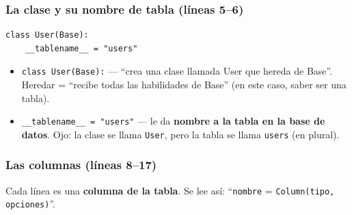 \documentclass[11pt,a4paper]{article}
\begin{document}
\subsubsection{La clase y su nombre de tabla (líneas 5--6)}

\begin{lstlisting}
class User(Base):
    __tablename__ = "users"
\end{lstlisting}

\begin{itemize}
    \item \texttt{class User(Base):} --- ``crea una clase llamada User que hereda de Base''.
    Heredar = ``recibe todas las habilidades de Base'' (en este caso, saber ser una tabla).
    \item \texttt{\_\_tablename\_\_ = "users"} --- le da \textbf{nombre a la tabla en la base de datos}.
    Ojo: la clase se llama \texttt{User}, pero la tabla se llama \texttt{users} (en plural).
\end{itemize}

\subsubsection{Las columnas (líneas 8--17)}

Cada línea es una \textbf{columna de la tabla}. Se lee así:
``\texttt{nombre} = \texttt{Column(tipo, opciones)}''.
\end{document}
